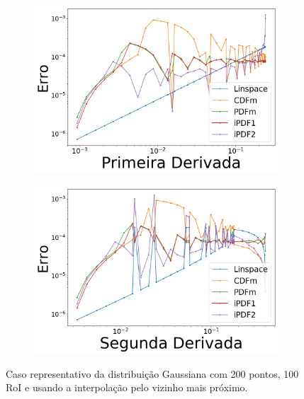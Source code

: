 \begin{figure}[H]
	\begin{subfigure}[b]{0.45\textwidth}
		\centering 
		\includegraphics[width=\textwidth]{./figuras/error_normal_nearest_Primeira_Derivada_1.png}
		\caption{}
		\label{fig:12c}
	\end{subfigure}
	\hfill
	\begin{subfigure}[b]{0.45\textwidth}
		\centering 
		\includegraphics[width=\textwidth]{./figuras/error_normal_nearest_Segunda_Derivada_1.png}
		\caption{}
		\label{fig:12d}
	\end{subfigure}
	\caption{Caso representativo da distribuição Gaussiana com 200 pontos, 100 \ac{RoI} e usando a interpolação pelo vizinho mais próximo.}
	\label{fig:12}
\end{figure}

